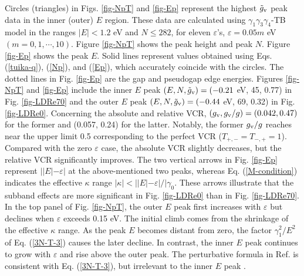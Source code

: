 \documentclass{jpsj3}
\begin{document}
Circles (triangles) in Figs. \ref{fig-NpT} and \ref{fig-Ep} 
 represent the highest $\tilde{g}_{\rm v}$ peak data in the inner (outer) $E$ region. These data are calculated using $\gamma_1\gamma_3\gamma_4$-TB model
in the ranges $|E| < 1.2$ eV and $N \leq 282 $,
for eleven $\varepsilon$'s, $\varepsilon=0.05m$ eV $(m=0,1,\cdots, 10)$.
Figure \ref{fig-NpT} 
shows the peak height and peak $N$. Figure \ref{fig-Ep}
shows the peak $E$.
Solid lines represent values obtained using Eqs. (\ref{tuika-q}), (\ref{Np}), 
 and (\ref{Ep}),  which accurately coincide with the circles.
The dotted lines in Fig. \ref{fig-Ep} are the gap and pseudogap
edge energies.
Figures \ref{fig-NpT} and \ref{fig-Ep} include
the inner $E$ peak $(E,N,\tilde{g}_{\rm v})
=(-0.21$ eV, 45, 0.77)
 in Fig. \ref{fig-LDRe70} 
and the outer $E$ peak $(E,N,\tilde{g}_{\rm v})=(-0.44$ eV, 69, 0.32)
 in Fig. \ref{fig-LDRe0}.
Concerning the absolute and relative VCR, $(g_{\rm v}, g_{\rm v}/g) = (0.042, 0.47)$
 for the former and (0.057, 0.24) for the latter.
Notably, the former $g_{\rm v}/g$ reaches near
the upper limit 0.5
corresponding to the perfect VCR ($T_{+,-}=T_{-,+}=1$).
Compared with the zero $\varepsilon$ case, the absolute VCR slightly decreases, but the relative VCR significantly improves.
The two vertical arrows in Fig. \ref{fig-Ep}
represent $||E|-\varepsilon|$ at the above-mentioned two peaks,
 whereas Eq. (\ref{M-condition}) indicates 
the effective $\kappa$ range $|\kappa|< ||E|-\varepsilon|/|\gamma_0$.
These arrows illustrate that the subband effects
are more significant in Fig. \ref{fig-LDRe0} 
than in Fig. \ref{fig-LDRe70}.
In the top panel of Fig. \ref{fig-NpT},
the outer $E$ peak first increases
with $\varepsilon$ but declines when $\varepsilon$ exceeds 0.15 eV.
The initial climb comes from the shrinkage of the effective
$\kappa$ range. 
As the peak $E$ becomes distant from zero, the factor $\gamma_1^2/E^2$ of
Eq. (\ref{3N-T-3}) causes the later decline.
In contrast, the inner $E$ peak continues to grow with $\varepsilon$ and 
rise above the outer peak. 
The perturbative formula in Ref. \cite{tamura-2021} is consistent with 
Eq. (\ref{3N-T-3}), but irrelevant to the inner $E$ peak \cite{note}.
\end{document}

